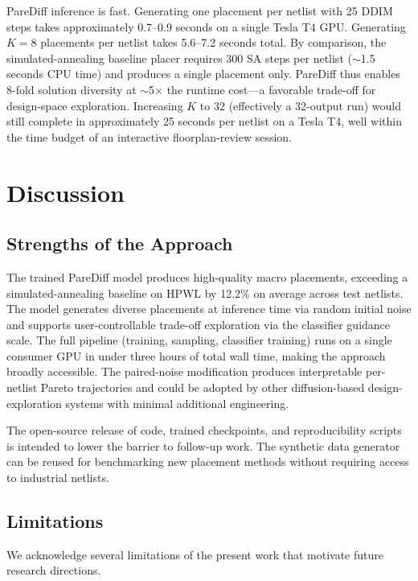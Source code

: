 \documentclass[lettersize,journal]{IEEEtran}
\begin{document}
PareDiff inference is fast. Generating one placement per netlist with 25 DDIM steps takes approximately 0.7--0.9 seconds on a single Tesla T4 GPU. Generating $K = 8$ placements per netlist takes 5.6--7.2 seconds total. By comparison, the simulated-annealing baseline placer requires 300 SA steps per netlist ($\sim$1.5 seconds CPU time) and produces a single placement only. PareDiff thus enables 8-fold solution diversity at $\sim$5$\times$ the runtime cost---a favorable trade-off for design-space exploration. Increasing $K$ to 32 (effectively a 32-output run) would still complete in approximately 25 seconds per netlist on a Tesla T4, well within the time budget of an interactive floorplan-review session.

\section{Discussion}
\label{sec:discussion}

\subsection{Strengths of the Approach}

The trained PareDiff model produces high-quality macro placements, exceeding a simulated-annealing baseline on HPWL by 12.2\% on average across test netlists. The model generates diverse placements at inference time via random initial noise and supports user-controllable trade-off exploration via the classifier guidance scale. The full pipeline (training, sampling, classifier training) runs on a single consumer GPU in under three hours of total wall time, making the approach broadly accessible. The paired-noise modification produces interpretable per-netlist Pareto trajectories and could be adopted by other diffusion-based design-exploration systems with minimal additional engineering.

The open-source release of code, trained checkpoints, and reproducibility scripts is intended to lower the barrier to follow-up work. The synthetic data generator can be reused for benchmarking new placement methods without requiring access to industrial netlists.

\subsection{Limitations}

We acknowledge several limitations of the present work that motivate future research directions.
\end{document}
